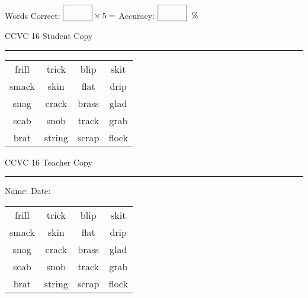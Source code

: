 \documentclass{memoir}
\begin{document}
\small

Words Correct: $\fbox{\phantom{\huge 100}} \times 5 = $ Accuracy: $\fbox{\phantom{\huge 100}}\;\; \%$ 

\vfill

\newpage


\footnotesize \noindent
CCVC 16 \hfill Student Copy
\smallskip
\hrule

\Large

\setlength{\tabcolsep}{14pt}
\def\arraystretch{3}

{\selectfont


\begin{vplace}[0.5]
\begin{center}
\begin{tabular}{cccc}
frill & trick & blip & skit \\
smack & skin & flat             & drip \\
snag & crack       & brass       & glad \\
scab & snob & track       & grab                    \\
brat               & string & scrap & flock \\
\end{tabular}
\end{center}
\end{vplace}

}

\newpage

\footnotesize \noindent
CCVC 16 \hfill Teacher Copy
\smallskip
\hrule

\small

\vfill

\noindent
Name: \underline{\hspace{1.75in}} \hfill Date: \underline{\hspace{1in}}

\Large

{\selectfont


\begin{vplace}[0.5]
\begin{center}
\begin{tabular}{cccc}
frill & trick & blip & skit \\
smack & skin & flat             & drip \\
snag & crack       & brass       & glad \\
scab & snob & track       & grab                    \\
brat               & string & scrap & flock \\
\end{tabular}
\end{center}
\end{vplace}



}
\end{document}
